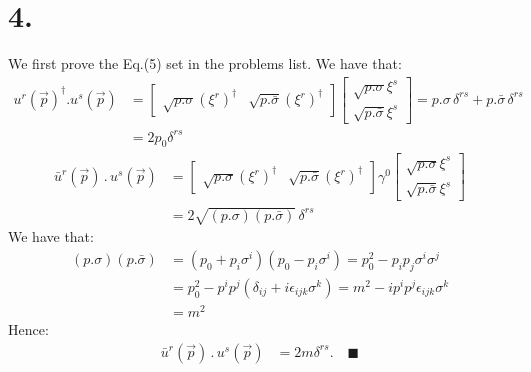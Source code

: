 \documentclass{article}
\newcommand{\vecp}{\vec{p}}
\begin{document}
\section*{4.}
We first prove the Eq.(5) set in the problems list. We have that:
\begin{equation}
    \begin{split}
        u^r(\vecp)^\dagger . u^s(\vecp) &= \begin{bmatrix}
            \sqrt{p.\sigma}(\xi^r)^\dagger & \sqrt{p.\bar{\sigma}}(\xi^r)^\dagger
        \end{bmatrix}\begin{bmatrix}
            \sqrt{p.\sigma}\xi^s \\ \sqrt{p.\bar{\sigma}}\xi^s
        \end{bmatrix} = p.\sigma \, \delta^{rs} + p.\bar{\sigma} \, \delta^{rs} \\
        & = 2p_0 \delta^{rs}
    \end{split}
\end{equation}
\begin{equation}
    \begin{split}
        \bar{u}^r(\vecp)\, . \, u^s(\vecp) &= \begin{bmatrix}
            \sqrt{p.\sigma}(\xi^r)^\dagger & \sqrt{p.\bar{\sigma}}(\xi^r)^\dagger
        \end{bmatrix}\gamma^0\begin{bmatrix}
            \sqrt{p.\sigma}\xi^s \\ \sqrt{p.\bar{\sigma}}\xi^s
        \end{bmatrix} \\
        &= 2\sqrt{(p.\sigma)(p.\bar{\sigma})}\, \delta^{rs}
    \end{split}
\end{equation}
We have that:
\begin{equation}
    \begin{split}
        (p.\sigma)(p.\bar{\sigma})&= (p_0 + p_i\sigma^i)(p_0 - p_i\sigma^i)=p_0^2-p_ip_j\sigma^i\sigma^j \\
        &=p_0^2-p^ip^j(\delta_{ij}+i\epsilon_{ijk} \sigma^k)=m^2-ip^ip^j\epsilon_{ijk} \sigma^k\\ 
        &= m^2
    \end{split}
\end{equation}
Hence:
\begin{equation}
    \begin{split}
        \bar{u}^r(\vecp)\, . \, u^s(\vecp) &= 2m\delta^{rs}. \quad \blacksquare
    \end{split}
\end{equation}
\end{document}
